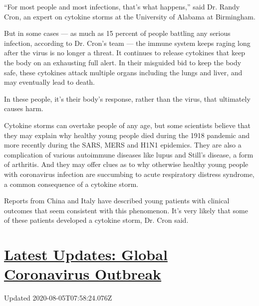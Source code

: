 ``For most people and most infections, that's what happens,'' said Dr.
Randy Cron, an expert on cytokine storms at the University of Alabama at
Birmingham.

But in some cases --- as much as 15 percent of people battling any
serious infection, according to Dr. Cron's team --- the immune system
keeps raging long after the virus is no longer a threat. It continues to
release cytokines that keep the body on an exhausting full alert. In
their misguided bid to keep the body safe, these cytokines attack
multiple organs including the lungs and liver, and may eventually lead
to death.

In these people, it's their body's response, rather than the virus, that
ultimately causes harm.

Cytokine storms can overtake people of any age, but some scientists
believe that they may explain why healthy young people died during the
1918 pandemic and more recently during the SARS, MERS and H1N1
epidemics. They are also a complication of various autoimmune diseases
like lupus and Still's disease, a form of arthritis. And they may offer
clues as to why otherwise healthy young people with coronavirus
infection are succumbing to acute respiratory distress syndrome, a
common consequence of a cytokine storm.

Reports from China and Italy have described young patients with clinical
outcomes that seem consistent with this phenomenon. It's very likely
that some of these patients developed a cytokine storm, Dr. Cron said.

\hypertarget{latest-updates-global-coronavirus-outbreak}{%
\section{\texorpdfstring{\href{https://www.nytimes3xbfgragh.onion/2020/08/04/world/coronavirus-cases.html?action=click\&pgtype=Article\&state=default\&region=MAIN_CONTENT_1\&context=storylines_live_updates}{Latest
Updates: Global Coronavirus
Outbreak}}{Latest Updates: Global Coronavirus Outbreak}}\label{latest-updates-global-coronavirus-outbreak}}

Updated 2020-08-05T07:58:24.076Z

